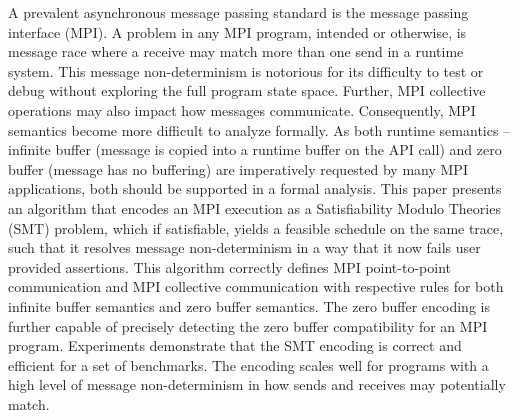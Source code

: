 %
A prevalent asynchronous message passing standard is the message passing interface (MPI).
%
A problem in any MPI program, intended or otherwise, is message race where a receive may match more than one send in a runtime system.
%
This message non-determinism is notorious for its difficulty to test or debug without exploring the full program state space. 
%
Further, MPI collective operations may also impact how messages communicate.
%
Consequently, MPI semantics become more difficult to analyze formally. 
%
As both runtime semantics -- infinite buffer (message is copied into a runtime buffer on the API call) and zero buffer (message has no buffering) are imperatively requested by many MPI applications, both should be supported in a formal analysis. 
%
This paper presents an algorithm that encodes an MPI execution as a Satisfiability Modulo Theories (SMT) problem, which if satisfiable, yields a feasible schedule on the same trace, such that it resolves message non-determinism in a way that it now fails user provided assertions.
%
This algorithm correctly defines MPI point-to-point communication and MPI collective communication with respective rules for both infinite buffer semantics and zero buffer semantics. 
%
The zero buffer encoding is further capable of precisely detecting the zero buffer compatibility for an MPI program.
%
Experiments demonstrate that the SMT encoding is correct and efficient for a set of benchmarks. 
%
The encoding scales well for programs with a high level of message non-determinism in how sends and receives may potentially match.